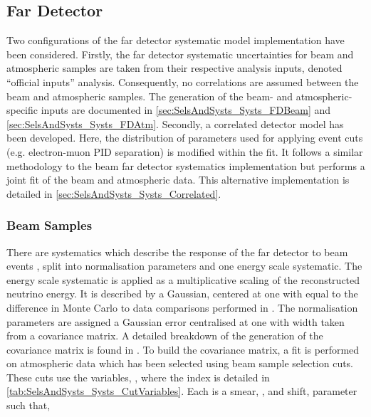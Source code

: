 \subsection{Far Detector}
\label{sec:SelsAndSysts_Systs_FD}

Two configurations of the far detector systematic model implementation have been considered. Firstly, the far detector systematic uncertainties for beam and atmospheric samples are taken from their respective analysis inputs, denoted ``official inputs'' analysis. Consequently, no correlations are assumed between the beam and atmospheric samples. The generation of the beam- and atmospheric-specific inputs are documented in \autoref{sec:SelsAndSysts_Systs_FDBeam} and \autoref{sec:SelsAndSysts_Systs_FDAtm}. Secondly, a correlated detector model has been developed. Here, the distribution of parameters used for applying event cuts (e.g. electron-muon PID separation) is modified within the fit. It follows a similar methodology to the beam far detector systematics implementation but performs a joint fit of the beam and atmospheric data. This alternative implementation is detailed in \autoref{sec:SelsAndSysts_Systs_Correlated}.

\subsubsection{Beam Samples}
\label{sec:SelsAndSysts_Systs_FDBeam}


There are  systematics which describe the response of the far detector to beam events \cite{t2k_tn_399}, split into  normalisation parameters and one energy scale systematic. The energy scale systematic is applied as a multiplicative scaling of the reconstructed neutrino energy. It is described by a Gaussian, centered at one with equal to the difference in Monte Carlo to data comparisons performed in \cite{sk_2017}. The normalisation parameters are assigned a Gaussian error centralised at one with width taken from a covariance matrix. A detailed breakdown of the generation of the covariance matrix is found in \cite{t2k_tn_318}. To build the covariance matrix, a fit is performed on atmospheric data which has been selected using beam sample selection cuts. These cuts use the variables, , where the index  is detailed in \autoref{tab:SelsAndSysts_Systs_CutVariables}. Each  is a smear, \quickmath{\alpha}, and shift, \quickmath{\beta} parameter such that,

